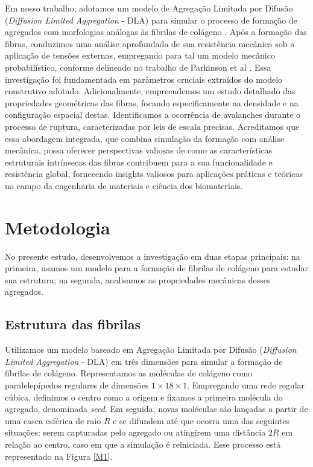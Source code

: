 \documentclass{report}
\begin{document}
    Em nosso trabalho, adotamos um modelo de Agregação Limitada por Difusão (\textit{Diffusion Limited Aggregation} - DLA) para simular 
    o processo de formação de agregados com morfologias análogas às fibrilas de colágeno \cite{Parkinson1995}. Após a formação das fibras, 
    conduzimos uma análise aprofundada de sua resistência mecânica sob a aplicação de tensões externas, empregando para tal um modelo mecânico 
    probabilístico, conforme delineado no trabalho de Parkinson et al \cite{Parkinson1997}. Essa investigação foi fundamentada em parâmetros 
    cruciais extraídos do modelo construtivo adotado. Adicionalmente, empreendemos um estudo detalhado das propriedades geométricas das fibras, 
    focando especificamente na densidade e na configuração espacial destas. Identificamos a ocorrência de avalanches durante o processo de ruptura, 
    caracterizadas por leis de escala precisas. Acreditamos que essa abordagem integrada, que combina simulação da formação com análise mecânica, possa 
    oferecer perspectivas valiosas de como as características estruturais intrínsecas das fibras contribuem para a sua funcionalidade e resistência 
    global, fornecendo insights valiosos para aplicações práticas e teóricas no campo da engenharia de materiais e ciência dos biomateriais.

\section{Metodologia}

    No presente estudo, desenvolvemos a investigação em duas etapas principais: na primeira, usamos um modelo para a formação de 
    fibrilas de colágeno para estudar sua estrutura; na segunda, analisamos as propriedades mecânicas desses agregados. 

    \subsection{Estrutura das fibrilas}

    Utilizamos um modelo baseado em Agregação Limitada por Difusão (\textit{Diffusion Limited Aggregation} - DLA) \cite{Witten1983} 
    em três dimensões para simular a formação de fibrilas de colágeno. Representamos as moléculas de colágeno como paralelepípedos 
    regulares de dimensões \(1 \times 18 \times 1\). Empregando uma rede regular cúbica, definimos o centro como a origem e fixamos 
    a primeira molécula do agregado, denominada \textit{seed}. Em seguida, novas moléculas são lançadas a partir de uma casca esférica
    de raio \(R\) e se difundem até que ocorra uma das seguintes situações: serem capturadas pelo agregado ou atingirem uma distância 
    \(2R\) em relação ao centro, caso em que a simulação é reiniciada. Esse processo está representado na Figura \ref{M1}. 
\end{document}
